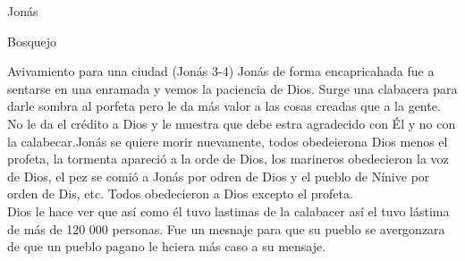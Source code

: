 \documentclass[12pt]{article}
\begin{document}
\begin{section}{Jonás}
\begin{subsection}{Bosquejo}
\begin{subsubsection}{Avivamiento para una ciudad (Jonás 3-4)}
			Jonás de forma encapricahada fue a sentarse en una enramada y vemos la paciencia de Dios. Surge una clabacera para darle sombra al porfeta pero le da más valor a las cosas creadas que a la gente. No le da el crédito a Dios y le muestra que debe estra agradecido con Él y no con la calabecar.Jonás se quiere morir nuevamente, todos obedeierona Dios menos el profeta, la tormenta apareció a la orde de Dios, los marineros obedecieron la voz de Dios, el pez se comió a Jonás por odren de Dios y el pueblo de Nínive por orden de Dis, etc. Todos obedecieron a Dios excepto el profeta.\\
			Dios le hace ver que así como él tuvo lastimas de la calabacer así el tuvo lástima de más de 120 000 personas. Fue un mesnaje para que su pueblo se avergonzara de que un pueblo pagano le hciera más caso a su mensaje.
		\end{subsubsection}
	\end{subsection}
\end{section}
\end{document}
